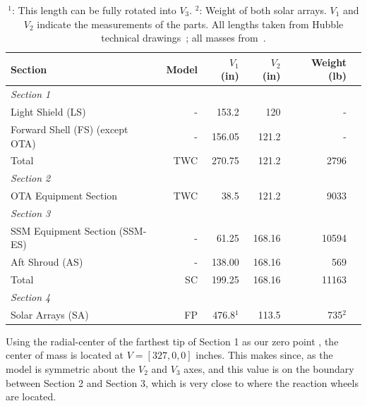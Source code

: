 \documentclass[onecolumn,10pt]{jhwhw}
\begin{document}
\begin{table}[t!]
\begin{center}
\begin{tabular}{l r r r r r}
\toprule
Section & Model & $V_1$ (in) & $V_2$ (in) & Weight (lb) \\
\midrule
\it{Section 1} & & & & \\
\hspace{1em} Light Shield (LS)   & - & 153.2  & 120  & - \\
\hspace{1em} Forward Shell (FS) (except OTA)  & - & 156.05 & 121.2 & - \\
\hspace{1em} Total  & TWC & 270.75 & 121.2 & 2796 \\
\it{Section 2} & & & & \\
\hspace{1em} OTA Equipment Section  & TWC & 38.5 & 121.2 & 9033 \\
\it{Section 3} & & & & \\
\hspace{1em} SSM Equipment Section (SSM-ES) & - &  61.25  &  168.16 & 10594\\
\hspace{1em} Aft Shroud (AS) & - &  138.00  &  168.16 & 569\\
\hspace{1em} Total  & SC & 199.25 & 168.16 & 11163 \\
\it{Section 4} & & & & \\
\hspace{1em} Solar Arrays (SA) & FP &  476.8$^1$  &  113.5 & 735$^2$\\
\bottomrule
\end{tabular}
\end{center}
\caption{$^1$: This length can be fully rotated into $V_3$. $^2$: Weight of both solar arrays. $V_1$ and $V_2$ indicate the measurements of the parts. All lengths taken from Hubble technical drawings~\cite{hst}; all masses from~\cite{mil}.}
\label{properties}
\end{table}


Using the radial-center of the farthest tip of Section 1 as our zero point , the center of mass is located at $V = [327, 0, 0]$ inches. This makes since, as the model is symmetric about the $V_2$ and $V_3$ axes, and this value is on the boundary between Section 2 and Section 3, which is very close to where the reaction wheels are located.
\end{document}
